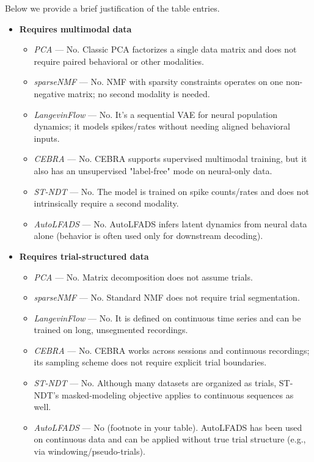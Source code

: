 \newpage

Below we provide a brief justification of the table entries.

\begin{itemize}
\item \textbf{Requires multimodal data}
    \begin{itemize}
    \item \textit{PCA} — No. Classic PCA factorizes a single data matrix and does not require paired behavioral or other modalities.
    \item \textit{sparseNMF} — No. NMF with sparsity constraints operates on one non-negative matrix; no second modality is needed.
    \item \textit{LangevinFlow} — No. It's a sequential VAE for neural population dynamics; it models spikes/rates without needing aligned behavioral inputs.
    \item \textit{CEBRA} — No. CEBRA supports supervised multimodal training, but it also has an unsupervised "label-free" mode on neural-only data.
    \item \textit{ST-NDT} — No. The model is trained on spike counts/rates and does not intrinsically require a second modality.
    \item \textit{AutoLFADS} — No. AutoLFADS infers latent dynamics from neural data alone (behavior is often used only for downstream decoding).
    \end{itemize}

\item \textbf{Requires trial-structured data}
    \begin{itemize}
    \item \textit{PCA} — No. Matrix decomposition does not assume trials.
    \item \textit{sparseNMF} — No. Standard NMF does not require trial segmentation.
    \item \textit{LangevinFlow} — No. It is defined on continuous time series and can be trained on long, unsegmented recordings.
    \item \textit{CEBRA} — No. CEBRA works across sessions and continuous recordings; its sampling scheme does not require explicit trial boundaries.
    \item \textit{ST-NDT} — No. Although many datasets are organized as trials, ST-NDT's masked-modeling objective applies to continuous sequences as well.
    \item \textit{AutoLFADS} — No (footnote in your table). AutoLFADS has been used on continuous data and can be applied without true trial structure (e.g., via windowing/pseudo-trials).
    \end{itemize}


\end{itemize}
